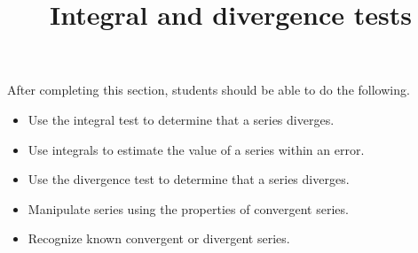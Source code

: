 \documentclass{ximera}
\title{Integral and divergence tests}
\begin{document}
\begin{abstract}
\end{abstract}

\maketitle

\begin{sectionOutcomes}

After completing this section, students should be able to do the following.

\begin{itemize}
\item Use the integral test to  determine that a series diverges.
\item Use integrals to estimate the value of a series within an error.
\item Use the divergence test to determine that a series diverges.
\item Manipulate series using the properties of convergent series.
\item Recognize known convergent or divergent series.
\end{itemize}

\end{sectionOutcomes}
\end{document}
